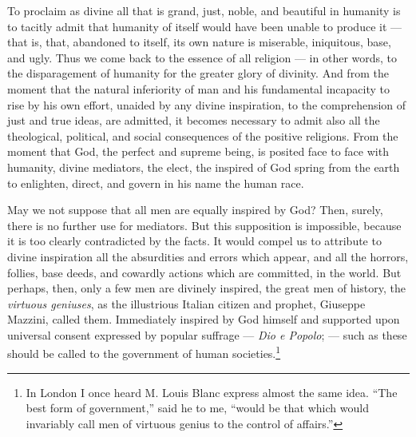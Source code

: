 \documentclass[12pt]{report}
\begin{document}
To proclaim as divine all that is grand, just, noble, and beautiful in humanity is to tacitly admit that humanity of itself would have been unable to produce it — that is, that, abandoned to itself, its own nature is miserable, iniquitous, base, and ugly. Thus we come back to the essence of all religion — in other words, to the disparagement of humanity for the greater glory of divinity. And from the moment that the natural inferiority of man and his fundamental incapacity to rise by his own effort, unaided by any divine inspiration, to the comprehension of just and true ideas, are admitted, it becomes necessary to admit also all the theological, political, and social consequences of the positive religions. From the moment that God, the perfect and supreme being, is posited face to face with humanity, divine mediators, the elect, the inspired of God spring from the earth to enlighten, direct, and govern in his name the human race.


May we not suppose that all men are equally inspired by God? Then, surely, there is no further use for mediators. But this supposition is impossible, because it is too clearly contradicted by the facts. It would compel us to attribute to divine inspiration all the absurdities and errors which appear, and all the horrors, follies, base deeds, and cowardly actions which are committed, in the world. But perhaps, then, only a few men are divinely inspired, the great men of history, the \emph{virtuous geniuses}, as the illustrious Italian citizen and prophet, Giuseppe Mazzini, called them. Immediately inspired by God himself and supported upon universal consent expressed by popular suffrage — \emph{Dio e Popolo}; — such as these should be called to the government of human societies.\footnote{In London I once heard M. Louis Blanc express almost the same idea. “The best form of government,” said he to me, “would be that which would invariably call men of virtuous genius to the control of affairs.”}
\end{document}
